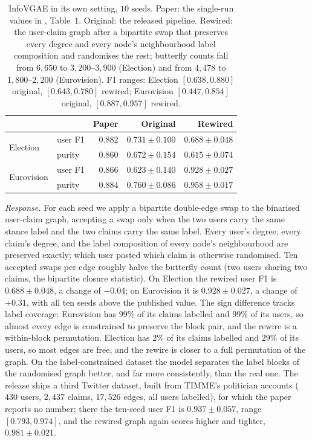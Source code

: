 \documentclass[letterpaper]{article} %
\begin{document}
\begin{table}[t]
\centering
\small
\setlength{\tabcolsep}{3pt}
\begin{tabular}{llrrr}
\toprule
& & Paper & Original & Rewired \\
\midrule
\multirow{2}{*}{Election}
& user F1 & $0.882$ & $0.731 \pm 0.100$ & $0.688 \pm 0.048$ \\
& purity  & $0.860$ & $0.672 \pm 0.154$ & $0.615 \pm 0.074$ \\
\multirow{2}{*}{Eurovision}
& user F1 & $0.866$ & $0.623 \pm 0.140$ & $0.928 \pm 0.027$ \\
& purity  & $0.884$ & $0.760 \pm 0.086$ & $0.958 \pm 0.017$ \\
\bottomrule
\end{tabular}
\caption{InfoVGAE in its own setting, $10$ seeds. Paper: the
single-run values in \citet{Li22InfoVGAE}, Table~1. Original:
the released pipeline. Rewired: the user-claim graph after a
bipartite swap that preserves every degree and every node's
neighbourhood label composition and randomises the rest;
butterfly counts fall from $6{,}650$ to $3{,}200$--$3{,}900$
(Election) and from $4{,}478$ to $1{,}800$--$2{,}200$
(Eurovision). F1 ranges: Election $[0.638, 0.880]$ original,
$[0.643, 0.780]$ rewired; Eurovision $[0.447, 0.854]$ original,
$[0.887, 0.957]$ rewired.}\label{tab:infovgae-native}
\end{table}

\emph{Response.} For each seed we apply a bipartite double-edge
swap to the binarised user-claim graph, accepting a swap only
when the two users carry the same stance label and the two
claims carry the same label. Every user's degree, every claim's
degree, and the label composition of every node's
neighbourhood are preserved exactly; which user posted which
claim is otherwise randomised. Ten accepted swaps per edge
roughly halve the butterfly count (two users sharing two
claims, the bipartite closure statistic). On Election the
rewired user F1 is $0.688 \pm 0.048$, a change of $-0.04$; on
Eurovision it is $0.928 \pm 0.027$, a change of $+0.31$, with
all ten seeds above the published value. The sign difference
tracks label coverage: Eurovision has $99\%$ of its claims
labelled and $99\%$ of its users, so almost every edge is
constrained to preserve the block pair, and the rewire is a
within-block permutation. Election has $2\%$ of its claims
labelled and $29\%$ of its users, so most edges are free, and
the rewire is closer to a full permutation of the graph. On
the label-constrained dataset the model separates the label
blocks of the randomised graph better, and far more
consistently, than the real one. The release
ships a third Twitter dataset, built from TIMME's politician
accounts ($430$ users, $2{,}437$ claims, $17{,}526$ edges, all
users labelled), for which the paper reports no number; there
the ten-seed user F1 is $0.937 \pm 0.057$, range
$[0.793, 0.974]$, and the rewired graph again scores higher
and tighter, $0.981 \pm 0.021$.
\end{document}
